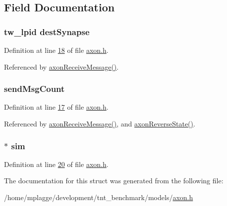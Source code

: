 \subsection{Field Documentation}
\hypertarget{structaxon_state_a665999819b255f36d756f17b85bc9a03}{}
\subsubsection[{dest\+Synapse}]{\setlength{\rightskip}{0pt plus 5cm}tw\+\_\+lpid dest\+Synapse}\label{structaxon_state_a665999819b255f36d756f17b85bc9a03}


Definition at line \hyperlink{axon_8h_source_l00018}{18} of file \hyperlink{axon_8h_source}{axon.\+h}.



Referenced by \hyperlink{axon_8c_source_l00011}{axon\+Receive\+Message()}.

\hypertarget{structaxon_state_a217ba44fb923dc4dc62bb73b14e61517}{}
\subsubsection[{send\+Msg\+Count}]{ send\+Msg\+Count}\label{structaxon_state_a217ba44fb923dc4dc62bb73b14e61517}


Definition at line \hyperlink{axon_8h_source_l00017}{17} of file \hyperlink{axon_8h_source}{axon.\+h}.



Referenced by \hyperlink{axon_8c_source_l00011}{axon\+Receive\+Message()}, and \hyperlink{axon_8c_source_l00029}{axon\+Reverse\+State()}.

\hypertarget{structaxon_state_ad1d67487729ff78dd3f00885184b1ef3}{}
\subsubsection[{sim}]{$\ast$ sim}\label{structaxon_state_ad1d67487729ff78dd3f00885184b1ef3}


Definition at line \hyperlink{axon_8h_source_l00020}{20} of file \hyperlink{axon_8h_source}{axon.\+h}.



The documentation for this struct was generated from the following file\+:\begin{DoxyCompactItemize}
\item 
/home/mplagge/development/tnt\+\_\+benchmark/models/\hyperlink{axon_8h}{axon.\+h}\end{DoxyCompactItemize}
